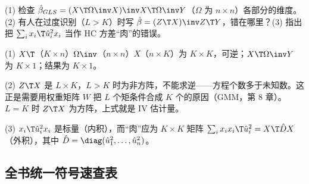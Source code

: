 \begin{prac}[维度检查]\label{pr:U01b-dim}
(1) 检查 $\hat\beta_{GLS}=(X\T\Omega\inv X)\inv X\T\Omega\inv Y$（$\Omega$ 为 $n\times n$）各部分的维度。(2) 有人在过度识别（$L>K$）时写 $\hat\beta=(Z\T X)\inv Z\T Y$，错在哪里？(3) 指出把 $\sum_ix_i\T\hat u_i^2x_i$ 当作 HC 方差“肉”的错误。

\answer (1) $X\T$（$K\times n$）$\Omega\inv$（$n\times n$）$X$（$n\times K$）为 $K\times K$，可逆；$X\T\Omega\inv Y$ 为 $K\times1$；结果为 $K\times1$。

(2) $Z\T X$ 是 $L\times K$，$L>K$ 时为非方阵，不能求逆——方程个数多于未知数。这正是需要用权重矩阵 $W$ 把 $L$ 个矩条件合成 $K$ 个的原因（GMM，第 8 章）。$L=K$ 时 $Z\T X$ 为方阵，上式就是 IV 估计量。

(3) $x_i\T\hat u_i^2x_i$ 是标量（内积），而“肉”应为 $K\times K$ 矩阵 $\sum_ix_ix_i\T\hat u_i^2=X\T\hat DX$（外积），其中 $\hat D=\diag(\hat u_1^2,\dots,\hat u_n^2)$。
\end{prac}

\subsection{全书统一符号速查表}

